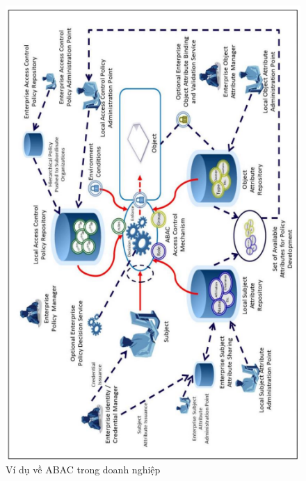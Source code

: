 \begin{figure}
    \centering
    \includegraphics{graphics/chapter-2/chap2-enterprise-abac.png}
    \caption{Ví dụ về ABAC trong doanh nghiệp \cite{hu2013guide}}
    \label{fig:chap2-enterprise-abac}
\end{figure}

